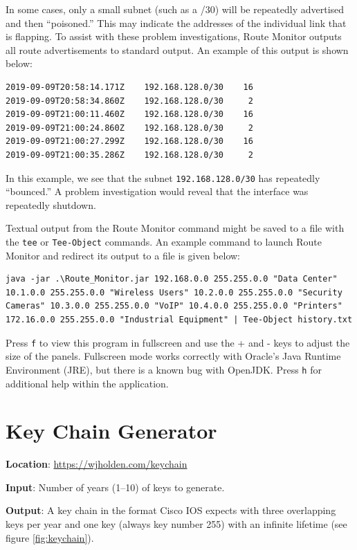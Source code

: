 \documentclass[12pt]{article}
\begin{document}
In some cases, only a small subnet (such as a /30) will be repeatedly advertised and then ``poisoned.'' This may indicate the addresses of the individual link that is flapping. To assist with these problem investigations, Route Monitor outputs all route advertisements to standard output. An example of this output is shown below:

\begin{lstlisting}
2019-09-09T20:58:14.171Z	192.168.128.0/30   	16
2019-09-09T20:58:34.860Z	192.168.128.0/30   	 2
2019-09-09T21:00:11.460Z	192.168.128.0/30   	16
2019-09-09T21:00:24.860Z	192.168.128.0/30   	 2
2019-09-09T21:00:27.299Z	192.168.128.0/30   	16
2019-09-09T21:00:35.286Z	192.168.128.0/30   	 2
\end{lstlisting}

In this example, we see that the subnet \texttt{192.168.128.0/30} has repeatedly ``bounced.'' A problem investigation would reveal that the interface was repeatedly shutdown.

Textual output from the Route Monitor command might be saved to a file with the \texttt{tee} or \texttt{Tee-Object} commands. An example command to launch Route Monitor and redirect its output to a file is given below:

\begin{lstlisting}
java -jar .\Route_Monitor.jar 192.168.0.0 255.255.0.0 "Data Center" 10.1.0.0 255.255.0.0 "Wireless Users" 10.2.0.0 255.255.0.0 "Security Cameras" 10.3.0.0 255.255.0.0 "VoIP" 10.4.0.0 255.255.0.0 "Printers" 172.16.0.0 255.255.0.0 "Industrial Equipment" | Tee-Object history.txt
\end{lstlisting}

Press \texttt{f} to view this program in fullscreen and use the + and - keys to adjust the size of the panels. Fullscreen mode works correctly with Oracle's Java Runtime Environment (JRE), but there is a known bug with OpenJDK. Press \texttt{h} for additional help within the application.

\section{Key Chain Generator} \label{sec:KeyChain}

\textbf{Location}: \url{https://wjholden.com/keychain}

\textbf{Input}: Number of years (1--10) of keys to generate.

\textbf{Output}: A key chain in the format Cisco IOS expects with three overlapping keys per year and one key (always key number 255) with an infinite lifetime (see figure \ref{fig:keychain}).
\end{document}

